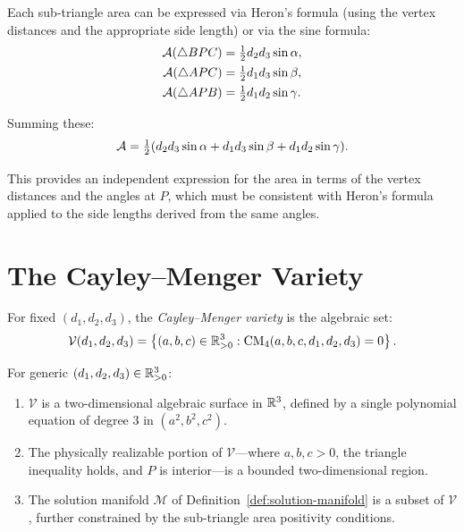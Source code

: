 Each sub-triangle area can be expressed via Heron's formula (using the vertex distances and the appropriate side length) or via the sine formula:
\begin{align}
\mathcal{A}(\triangle BPC) &= \tfrac{1}{2} d_2 d_3 \sin\alpha, \label{eq:area-sub1} \\
\mathcal{A}(\triangle APC) &= \tfrac{1}{2} d_1 d_3 \sin\beta, \label{eq:area-sub2} \\
\mathcal{A}(\triangle APB) &= \tfrac{1}{2} d_1 d_2 \sin\gamma. \label{eq:area-sub3}
\end{align}

Summing these:
\begin{equation}
\label{eq:area-total}
\mathcal{A} = \tfrac{1}{2}(d_2 d_3 \sin\alpha + d_1 d_3 \sin\beta + d_1 d_2 \sin\gamma).
\end{equation}

This provides an independent expression for the area in terms of the vertex distances and the angles at $P$, which must be consistent with Heron's formula applied to the side lengths derived from the same angles.

\section{The Cayley--Menger Variety}

\begin{definition}
For fixed $(d_1, d_2, d_3)$, the \emph{Cayley--Menger variety} is the algebraic set:
\begin{equation}
\mathcal{V}(d_1, d_2, d_3) = \left\{(a, b, c) \in \mathbb{R}_{>0}^3 : \mathrm{CM}_4(a, b, c, d_1, d_2, d_3) = 0 \right\}.
\end{equation}
\end{definition}

\begin{theorem}
\label{thm:cm-variety}
For generic $(d_1, d_2, d_3) \in \mathbb{R}_{>0}^3$:
\begin{enumerate}[label=(\roman*)]
    \item $\mathcal{V}$ is a two-dimensional algebraic surface in $\mathbb{R}^3$, defined by a single polynomial equation of degree 3 in $(a^2, b^2, c^2)$.
    \item The physically realizable portion of $\mathcal{V}$---where $a, b, c > 0$, the triangle inequality holds, and $P$ is interior---is a bounded two-dimensional region.
    \item The solution manifold $\mathcal{M}$ of Definition~\ref{def:solution-manifold} is a subset of $\mathcal{V}$, further constrained by the sub-triangle area positivity conditions.
\end{enumerate}
\end{theorem}

